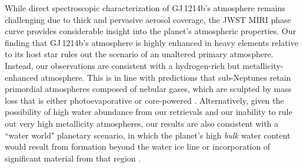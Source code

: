 \documentclass[pdflatex,sn-standardnature]{sn-jnl}%
\begin{document}

While direct spectroscopic characterization of GJ\,1214b's atmosphere remains challenging due to thick and pervasive aerosol coverage, the JWST MIRI phase curve provides considerable insight into the planet's atmospheric properties.  Our finding that GJ\,1214b's atmosphere is highly enhanced in heavy elements relative to its host star rules out the scenario of an unaltered primary atmosphere.  Instead, our observations are consistent with a hydrogen-rich but metallicity-enhanced atmosphere. This is in line with predictions that sub-Neptunes retain primordial atmospheres composed of nebular gases, which are sculpted by mass loss that is either photoevaporative or core-powered \cite{owen13,gupta19}.  Alternatively, given the possibility of high water abundance from our retrievals and our inability to rule out very high metallicity atmospheres, our results are also consistent with a  ``water world" planetary scenario, in which the planet's high \textit{bulk} water content would result from formation beyond the water ice line or incorporation of significant material from that region  \cite{kuchner03,leger04,rogers10b}.  
\end{document}

